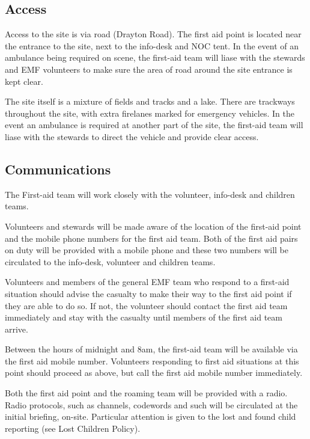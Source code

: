 \subsection{Access}

Access to the site is via road (Drayton Road). The first aid point is located near the entrance to the site, next to the info-desk and NOC tent. In the event of an ambulance being required on scene, the first-aid team will liase with the stewards and EMF volunteers to make sure the area of road around the site entrance is kept clear.

The site itself is a mixture of fields and tracks and a lake. There are trackways throughout the site, with extra firelanes marked for emergency vehicles. In the event an ambulance is required at another part of the site, the first-aid team will liase with the stewards to direct the vehicle and provide clear access. 

\subsection{Communications}

The First-aid team will work closely with the volunteer, info-desk and children teams.

Volunteers and stewards will be made aware of the location of the first-aid point and the mobile phone numbers for the first aid team. Both of the first aid pairs on duty will be provided with a mobile phone and these two numbers will be circulated to the info-desk, volunteer and children teams. 

Volunteers and members of the general EMF team who respond to a first-aid situation should advise the casualty to make their way to the first aid point if they are able to do so. If not, the volunteer should contact the first aid team immediately and stay with the casualty until members of the first aid team arrive.

Between the hours of midnight and 8am, the first-aid team will be available via the first aid mobile number. Volunteers responding to first aid situations at this point should proceed as above, but call the first aid mobile number immediately. 

Both the first aid point and the roaming team will be provided with a radio. Radio protocols, such as channels, codewords and such will be circulated at the initial briefing, on-site. Particular attention is given to the lost and found child reporting (see Lost Children Policy). 

